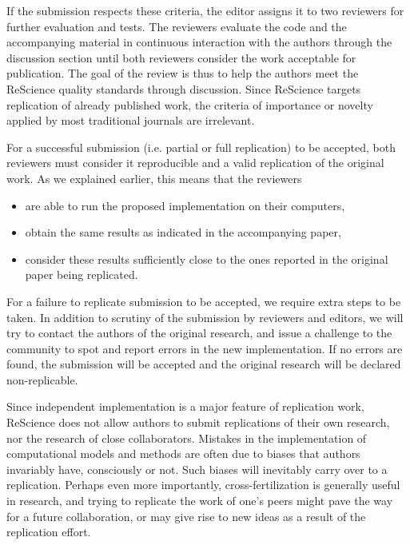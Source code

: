 \documentclass[11pt]{article}
\begin{document}
If the submission respects these criteria, the editor assigns it to
two reviewers for further evaluation and tests. The reviewers evaluate
the code and the accompanying material in continuous interaction with
the authors through the discussion section until both reviewers
consider the work acceptable for publication. The goal of the review
is thus to help the authors meet the ReScience quality standards
through discussion. Since ReScience targets replication of already
published work, the criteria of importance or novelty applied by most
traditional journals are irrelevant.

For a successful submission (i.e. partial or full replication) to be accepted,
both reviewers must consider it reproducible and a valid replication of the
original work. As we explained earlier, this means that the reviewers
\begin{itemize}
\item are able to run the proposed implementation on their computers,
\item obtain the same results as indicated in the accompanying paper,
\item consider these results sufficiently close to the ones reported in the
  original paper being replicated.
\end{itemize}

For a failure to replicate submission to be accepted, we require extra steps
to be taken. In addition to scrutiny of the submission by reviewers and
editors, we will try to contact the authors of the original research, and issue
a challenge to the community to spot and report errors in the new implementation.
If no errors are found, the submission will be accepted and the original
research will be declared non-replicable.

%

Since independent implementation is a major feature of replication
work, ReScience does not allow authors to submit replications of their
own research, nor the research of close collaborators. Mistakes in the
implementation of computational models and methods are often due to
biases that authors invariably have, consciously or not. Such biases
will inevitably carry over to a replication. Perhaps even more
importantly, cross-fertilization is generally useful in research, and
trying to replicate the work of one’s peers might pave the way for a
future collaboration, or may give rise to new ideas as a result of the
replication effort.
\end{document}
